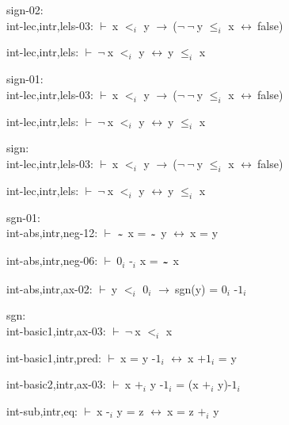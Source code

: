 \documentclass[a4paper]{article}
\newcommand{\tildesym}{\raisebox{-4pt}{\bf\~{}}}
\newcommand{\Fol}{\mbox{$\vdash\ $}}
\newcommand{\Not}{\mbox{$\neg\ $}}
\newcommand{\Imp}{\mbox{$\rightarrow\ $}}
\newcommand{\Equiv}{\mbox{$\leftrightarrow\ $}}
\begin{document}
\bigskip

sign-02:\\ int-lec,intr,lels-03: 
 \Fol x $\mbox{$<$}_{i}$ y \Imp (\Not \Not y $\mbox{$\le$}_{i}$ x \Equiv false)



int-lec,intr,lels: 
 \Fol \Not x $\mbox{$<$}_{i}$ y \Equiv y $\mbox{$\le$}_{i}$ x



\bigskip

sign-01:\\ int-lec,intr,lels-03: 
 \Fol x $\mbox{$<$}_{i}$ y \Imp (\Not \Not y $\mbox{$\le$}_{i}$ x \Equiv false)



int-lec,intr,lels: 
 \Fol \Not x $\mbox{$<$}_{i}$ y \Equiv y $\mbox{$\le$}_{i}$ x



\bigskip

sign:\\ int-lec,intr,lels-03: 
 \Fol x $\mbox{$<$}_{i}$ y \Imp (\Not \Not y $\mbox{$\le$}_{i}$ x \Equiv false)



int-lec,intr,lels: 
 \Fol \Not x $\mbox{$<$}_{i}$ y \Equiv y $\mbox{$\le$}_{i}$ x



\bigskip

sgn-01:\\ int-abs,intr,neg-12: 
 \Fol $\tildesym$ x = $\tildesym$ y \Equiv x = y



int-abs,intr,neg-06: 
 \Fol $\mbox{0}_{i}$ $\mbox{-}_{i}$ x = $\tildesym$ x



int-abs,intr,ax-02: 
 \Fol y $\mbox{$<$}_{i}$ $\mbox{0}_{i}$ \Imp sgn(y) = $\mbox{0}_{i}$ $\mbox{-1}_{i}$



\bigskip

sgn:\\ int-basic1,intr,ax-03: 
 \Fol \Not x $\mbox{$<$}_{i}$ x



int-basic1,intr,pred: 
 \Fol x = y $\mbox{-1}_{i}$ \Equiv x $\mbox{+1}_{i}$ = y



int-basic2,intr,ax-03: 
 \Fol x $\mbox{+}_{i}$ y $\mbox{-1}_{i}$ = (x $\mbox{+}_{i}$ y)$\mbox{-1}_{i}$



int-sub,intr,eq: 
 \Fol x $\mbox{-}_{i}$ y = z \Equiv x = z $\mbox{+}_{i}$ y
\end{document}
